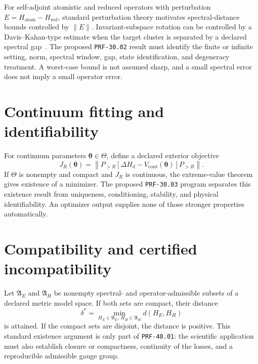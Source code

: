 
For self-adjoint atomistic and reduced operators with perturbation
$E=H_{\mathrm{atom}}-H_{\mathrm{red}}$, standard perturbation theory motivates
spectral-distance bounds controlled by $\|E\|$. Invariant-subspace rotation can
be controlled by a Davis--Kahan-type estimate when the target cluster is
separated by a declared spectral gap~\cite{davis1970}. The proposed
\texttt{PRF-30.02} result must identify the finite or infinite setting, norm,
spectral window, gap, state identification, and degeneracy treatment. A
worst-case bound is not assumed sharp, and a small spectral error does not imply
a small operator error.


\section{Continuum fitting and identifiability}


For continuum parameters $\boldsymbol\theta\in\Theta$, define a declared
exterior objective
\begin{equation}
  J_R(\boldsymbol\theta)
  =
  \left\|
    P_{>R}
    [\Delta H_d-V_{\mathrm{cont}}(\boldsymbol\theta)]
    P_{>R}
  \right\|.
\end{equation}
If $\Theta$ is nonempty and compact and $J_R$ is continuous, the extreme-value
theorem gives existence of a minimizer. The proposed \texttt{PRF-30.03}
program separates this existence result from uniqueness, conditioning,
stability, and physical identifiability. An optimizer output supplies none of
those stronger properties automatically.

\section{Compatibility and certified incompatibility}


Let $\mathfrak A_E$ and $\mathfrak A_H$ be nonempty spectral- and
operator-admissible subsets of a declared metric model space. If both sets are
compact, their distance
\begin{equation}
  \delta^{\ast}
  =
  \min_{H_E\in\mathfrak A_E,\,H_H\in\mathfrak A_H}
  d(H_E,H_H)
\end{equation}
is attained. If the compact sets are disjoint, the distance is positive. This
standard existence argument is only part of \texttt{PRF-40.01}: the scientific
application must also establish closure or compactness, continuity of the
losses, and a reproducible admissible gauge group.

